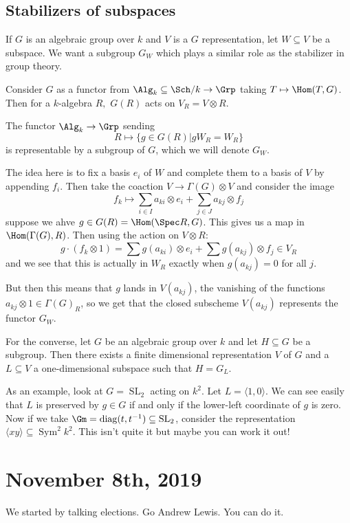 \documentclass[12pt]{article}
\DeclareMathOperator{\SL}{SL}
\begin{document}
\subsection{Stabilizers of subspaces}
If $G$ is an algebraic group over $k$ and $V$ is a $G$ representation, let $W\subseteq V$ be a subspace. We want a subgroup $G_W$ which plays a similar role as the stabilizer in group theory.

Consider $G$ as a functor from $\Alg_k\subseteq \Sch/k\to\Grp$ taking $T\mapsto\Hom(T,G)$. Then for a $k$-algebra $R,$ $G(R)$
acts on $V_R=V\otimes R$.
\begin{prop}
	The functor $\Alg_k\to\Grp$ sending 
	\[R\mapsto \{g\in G(R)|gW_R=W_R\}\]
	is representable by a subgroup of $G$, which we will denote $G_W$.
\end{prop}
\begin{rmk}
	The idea here is to fix a basis $e_i$ of $W$ and complete them to a basis of $V$ by appending $f_i$. Then take the coaction $V\to\Gamma(G)\otimes V$ and consider the image 
	\[f_k\mapsto \sum_{i\in I}a_{ki}\otimes e_i+\sum_{j\in J}a_{kj}\otimes f_j\]
	suppose we ahve $g\in G(R)=\Hom(\Spec R, G)$. This gives us a map in $\Hom(\Gamma(G),R)$. Then using the action on $V\otimes R$:
	\[g\cdot(f_k\otimes 1)=\sum g(a_{ki})\otimes e_i+\sum g(a_{kj})\otimes f_j\in V_R\]
	and we see that this is actually in $W_R$ exactly when $g(a_{kj})=0$ for all $j$.

	But then this means that $g$ lands in $V(a_{kj})$, the vanishing of the functions $a_{kj}\otimes 1\in\Gamma(G)_R$, so we get that 
	the closed subscheme $V(a_{kj})$ represents the functor $G_W$.
\end{rmk}

For the converse, let $G$ be an algebraic group over $k$ and let $H\subseteq G$ be a subgroup. Then there exists a finite dimensional representation $V$ of $G$ and 
a $L\subseteq V$ a one-dimensional subspace such that $H=G_L$.

As an example, look at $G=\SL_2$ acting on $k^2$. Let $L=\langle 1,0\rangle$. We can see easily that $L$ is preserved by $g\in G$ if and only if the lower-left coordinate of $g$ is zero.
Now if we take $\Gm=\operatorname{diag}(t,t^{-1})\subseteq\SL_2$, consider the representation $\langle xy\rangle\subseteq \operatorname{Sym}^2k^2$. This isn't quite it but maybe you can work it out!

\section{November 8th, 2019}
We started by talking elections. Go Andrew Lewis. You can do it.
\end{document}
